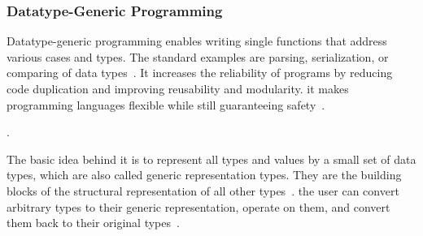 \begin{frame}\frametitle{Datatype-Generic Programming}
    
Datatype-generic programming enables writing single functions that address various cases and types. The standard examples are parsing,  serialization, or comparing of data types~\cite{derivable-type-classes}. It increases the reliability of programs by reducing code duplication and improving reusability and modularity. it makes programming languages flexible while still guaranteeing safety~\cite{datatype-generic-programming,optimizing-generics}.
  
. 
    
The basic idea behind it is to represent all types and values by a small set of data types, which are also called generic representation types. They are the building blocks of the structural representation of all other types~\cite{optimizing-generics}. the user can convert arbitrary types to their generic representation, operate on them, and convert them back to their original types~\cite{optimizing-generics,history-of-haskell, ghc-generics}.

\end{frame}